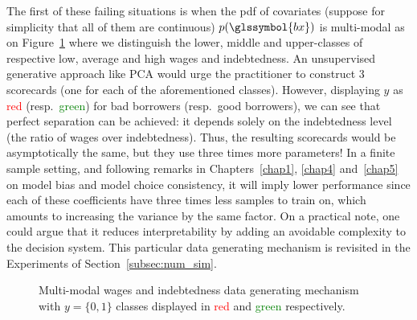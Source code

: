 The first of these failing situations is when the \gls{pdf} of covariates (suppose for simplicity that all of them are continuous) $p(\glssymbol{bx})$ is multi-modal as on Figure~\ref{fig:xdiff} where we distinguish the lower, middle and upper-classes of respective low, average and high wages and indebtedness. An unsupervised generative approach like PCA would urge the practitioner to construct 3 scorecards (one for each of the aforementioned classes). However, displaying $y$ as \textcolor{red}{red} (resp.\ \textcolor{green}{green}) for bad borrowers (resp.\ good borrowers), we can see that perfect separation can be achieved: it depends solely on the indebtedness level (the ratio of wages over indebtedness). Thus, the resulting scorecards would be asymptotically the same, but they use three times more parameters! In a finite sample setting, and following remarks in Chapters~\ref{chap1}, \ref{chap4} and~\ref{chap5} on model bias and model choice consistency, it will imply lower performance since each of these coefficients have three times less samples to train on, which amounts to increasing the variance by the same factor. On a practical note, one could argue that it reduces interpretability by adding an avoidable complexity to the decision system. This particular data generating mechanism is revisited in the Experiments of Section~\ref{subsec:num_sim}.


\begin{figure}
\centering
{}
\caption{\label{fig:xdiff} Multi-modal wages and indebtedness data generating mechanism with $y = \{0,1\}$ classes displayed in \textcolor{red}{red} and \textcolor{green}{green} respectively.}
\end{figure}

